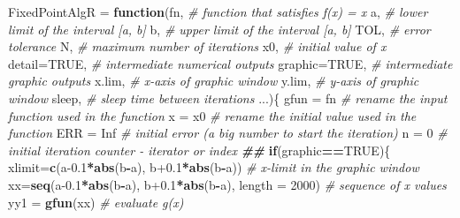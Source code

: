 \documentclass[
]{book}
\newenvironment{Shaded}{\begin{snugshade}}{\end{snugshade}}
\newcommand{\AttributeTok}[1]{\textcolor[rgb]{0.13,0.29,0.53}{#1}}
\newcommand{\CommentTok}[1]{\textcolor[rgb]{0.56,0.35,0.01}{\textit{#1}}}
\newcommand{\ConstantTok}[1]{\textcolor[rgb]{0.56,0.35,0.01}{#1}}
\newcommand{\ControlFlowTok}[1]{\textcolor[rgb]{0.13,0.29,0.53}{\textbf{#1}}}
\newcommand{\DecValTok}[1]{\textcolor[rgb]{0.00,0.00,0.81}{#1}}
\newcommand{\DocumentationTok}[1]{\textcolor[rgb]{0.56,0.35,0.01}{\textbf{\textit{#1}}}}
\newcommand{\FloatTok}[1]{\textcolor[rgb]{0.00,0.00,0.81}{#1}}
\newcommand{\FunctionTok}[1]{\textcolor[rgb]{0.13,0.29,0.53}{\textbf{#1}}}
\newcommand{\NormalTok}[1]{#1}
\newcommand{\OtherTok}[1]{\textcolor[rgb]{0.56,0.35,0.01}{#1}}
\newcommand{\SpecialCharTok}[1]{\textcolor[rgb]{0.81,0.36,0.00}{\textbf{#1}}}
\begin{document}
\begin{Shaded}
\begin{Highlighting}[]
\NormalTok{FixedPointAlgR }\OtherTok{=} \ControlFlowTok{function}\NormalTok{(fn,       }\CommentTok{\# function that satisfies f(x) = x}
\NormalTok{                          a,        }\CommentTok{\# lower limit of the interval [a, b]}
\NormalTok{                          b,        }\CommentTok{\# upper limit of the interval [a, b]}
\NormalTok{                          TOL,      }\CommentTok{\# error tolerance}
\NormalTok{                          N,        }\CommentTok{\# maximum number of iterations}
\NormalTok{                          x0,       }\CommentTok{\# initial value of x}
                          \AttributeTok{detail=}\ConstantTok{TRUE}\NormalTok{,   }\CommentTok{\# intermediate numerical outputs}
                          \AttributeTok{graphic=}\ConstantTok{TRUE}\NormalTok{,  }\CommentTok{\# intermediate graphic outputs}
\NormalTok{                          x.lim,    }\CommentTok{\# x{-}axis of graphic window}
\NormalTok{                          y.lim,    }\CommentTok{\# y{-}axis of graphic window}
\NormalTok{                          sleep,    }\CommentTok{\# sleep time between iterations}
\NormalTok{                          ...)\{}
\NormalTok{ gfun }\OtherTok{=}\NormalTok{ fn      }\CommentTok{\# rename the input function used in the function}
\NormalTok{ x }\OtherTok{=}\NormalTok{ x0         }\CommentTok{\# rename the initial value used in the function}
\NormalTok{ ERR }\OtherTok{=} \ConstantTok{Inf}      \CommentTok{\# initial error (a big  number to start the iteration)}
\NormalTok{ n }\OtherTok{=} \DecValTok{0}          \CommentTok{\# initial iteration counter {-} iterator or index}
\DocumentationTok{\#\#}
 \ControlFlowTok{if}\NormalTok{(graphic}\SpecialCharTok{==}\ConstantTok{TRUE}\NormalTok{)\{}
\NormalTok{ xlimit}\OtherTok{=}\FunctionTok{c}\NormalTok{(a}\FloatTok{{-}0.1}\SpecialCharTok{*}\FunctionTok{abs}\NormalTok{(b}\SpecialCharTok{{-}}\NormalTok{a), b}\FloatTok{+0.1}\SpecialCharTok{*}\FunctionTok{abs}\NormalTok{(b}\SpecialCharTok{{-}}\NormalTok{a))               }\CommentTok{\# x{-}limit in the graphic window}
\NormalTok{ xx}\OtherTok{=}\FunctionTok{seq}\NormalTok{(a}\FloatTok{{-}0.1}\SpecialCharTok{*}\FunctionTok{abs}\NormalTok{(b}\SpecialCharTok{{-}}\NormalTok{a), b}\FloatTok{+0.1}\SpecialCharTok{*}\FunctionTok{abs}\NormalTok{(b}\SpecialCharTok{{-}}\NormalTok{a), }\AttributeTok{length =} \DecValTok{2000}\NormalTok{)  }\CommentTok{\# sequence of x values}
\NormalTok{ yy1 }\OtherTok{=} \FunctionTok{gfun}\NormalTok{(xx)                                         }\CommentTok{\# evaluate g(x)}

\end{Highlighting}
\end{Shaded}
\end{document}
